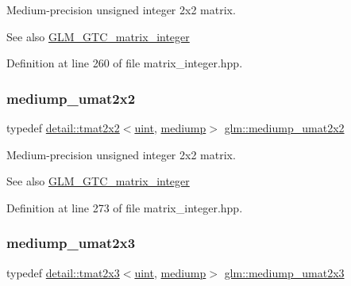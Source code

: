 Medium-\/precision unsigned integer 2x2 matrix. \begin{DoxySeeAlso}{See also}
\hyperlink{group__gtc__matrix__integer}{G\+L\+M\+\_\+\+G\+T\+C\+\_\+matrix\+\_\+integer} 
\end{DoxySeeAlso}


Definition at line 260 of file matrix\+\_\+integer.\+hpp.

\mbox{\label{group__gtc__matrix__integer_ga80e478f09c6caa16410198ce78fe8a2b}} 
\subsubsection{\texorpdfstring{mediump\+\_\+umat2x2}{mediump\_umat2x2}}
{\footnotesize\ttfamily typedef \hyperlink{structglm_1_1detail_1_1tmat2x2}{detail\+::tmat2x2}$<$\hyperlink{group__core__precision_ga4fd29415871152bfb5abd588334147c8}{uint}, \hyperlink{namespaceglm_a0f04f086094c747d227af4425893f545a6416f3ea0c9025fb21ed50c4d6620482}{mediump}$>$ \hyperlink{group__gtc__matrix__integer_ga80e478f09c6caa16410198ce78fe8a2b}{glm\+::mediump\+\_\+umat2x2}}

Medium-\/precision unsigned integer 2x2 matrix. \begin{DoxySeeAlso}{See also}
\hyperlink{group__gtc__matrix__integer}{G\+L\+M\+\_\+\+G\+T\+C\+\_\+matrix\+\_\+integer} 
\end{DoxySeeAlso}


Definition at line 273 of file matrix\+\_\+integer.\+hpp.

\mbox{\label{group__gtc__matrix__integer_gaaae45c5dbaad1ecd57bfa936d851be1b}} 
\subsubsection{\texorpdfstring{mediump\+\_\+umat2x3}{mediump\_umat2x3}}
{\footnotesize\ttfamily typedef \hyperlink{structglm_1_1detail_1_1tmat2x3}{detail\+::tmat2x3}$<$\hyperlink{group__core__precision_ga4fd29415871152bfb5abd588334147c8}{uint}, \hyperlink{namespaceglm_a0f04f086094c747d227af4425893f545a6416f3ea0c9025fb21ed50c4d6620482}{mediump}$>$ \hyperlink{group__gtc__matrix__integer_gaaae45c5dbaad1ecd57bfa936d851be1b}{glm\+::mediump\+\_\+umat2x3}}

